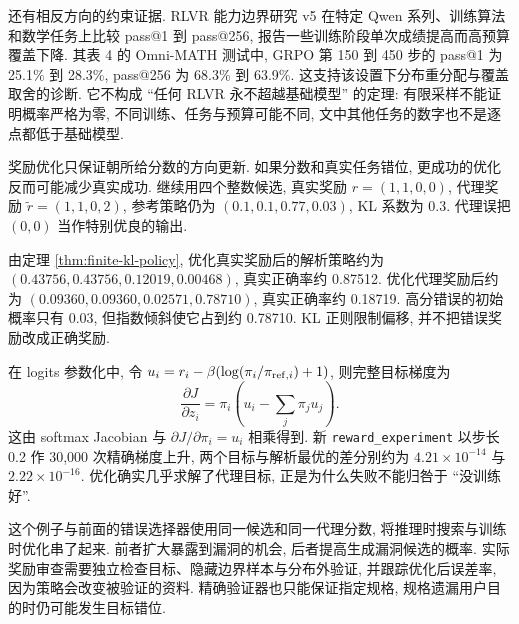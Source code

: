 还有相反方向的约束证据. RLVR 能力边界研究 v5 在特定 Qwen 系列、训练算法和数学任务上比较 pass@1 到 pass@256, 报告一些训练阶段单次成绩提高而高预算覆盖下降\cite{rlvrboundary}. 其表 4 的 Omni-MATH 测试中, GRPO 第 150 到 450 步的 pass@1 为 25.1\% 到 28.3\%, pass@256 为 68.3\% 到 63.9\%. 这支持该设置下分布重分配与覆盖取舍的诊断. 它不构成 ``任何 RLVR 永不超越基础模型'' 的定理: 有限采样不能证明概率严格为零, 不同训练、任务与预算可能不同, 文中其他任务的数字也不是逐点都低于基础模型.

\label{sec:reason-hacking}
奖励优化只保证朝所给分数的方向更新. 如果分数和真实任务错位, 更成功的优化反而可能减少真实成功. 继续用四个整数候选, 真实奖励 $r=(1,1,0,0)$, 代理奖励 $\widetilde r=(1,1,0,2)$, 参考策略仍为 $(0.1,0.1,0.77,0.03)$, KL 系数为 0.3. 代理误把 $(0,0)$ 当作特别优良的输出.

由定理 \ref{thm:finite-kl-policy}, 优化真实奖励后的解析策略约为 $(0.43756,0.43756,0.12019,0.00468)$, 真实正确率约 0.87512. 优化代理奖励后约为 $(0.09360,0.09360,0.02571,0.78710)$, 真实正确率约 0.18719. 高分错误的初始概率只有 0.03, 但指数倾斜使它占到约 0.78710. KL 正则限制偏移, 并不把错误奖励改成正确奖励.

在 logits 参数化中, 令 $u_i=r_i-\beta(\log(\pi_i/\pi_{{\rm ref},i})+1)$, 则完整目标梯度为
\[
\frac{\partial J}{\partial z_i}=\pi_i(u_i-\sum_j\pi_ju_j).
\]
这由 softmax Jacobian 与 $\partial J/\partial\pi_i=u_i$ 相乘得到. 新 \texttt{reward\_experiment} 以步长 0.2 作 30,000 次精确梯度上升, 两个目标与解析最优的差分别约为 $4.21\times10^{-14}$ 与 $2.22\times10^{-16}$. 优化确实几乎求解了代理目标, 正是为什么失败不能归咎于 ``没训练好''.

这个例子与前面的错误选择器使用同一候选和同一代理分数, 将推理时搜索与训练时优化串了起来. 前者扩大暴露到漏洞的机会, 后者提高生成漏洞候选的概率. 实际奖励审查需要独立检查目标、隐藏边界样本与分布外验证, 并跟踪优化后误差率, 因为策略会改变被验证的资料. 精确验证器也只能保证指定规格, 规格遗漏用户目的时仍可能发生目标错位.

